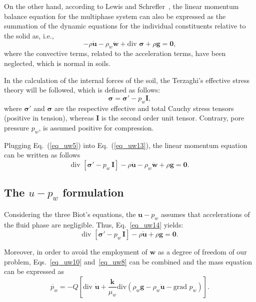 \documentclass[twocolumn]{svjour3}          %
\begin{document}
On the other hand, according to Lewis and Schrefler~\cite{LewisSchrefler98},   the linear momentum balance equation for the multiphase system  can also be expressed as the summation of the dynamic equations for the individual constituents relative to the solid as, i.e.,
\begin{equation}\label{eq_uw13}
-\rho\ddot{\boldsymbol{u}} - \rho_w\ddot{\boldsymbol{w}} + \mbox{div } \boldsymbol{\sigma}+\rho\boldsymbol{g}=\boldsymbol{0},
\end{equation}
where the convective terms, related to the acceleration terms, have been neglected, which is normal in soils. 

{\color{blue}In the calculation of the internal forces of the soil, the Terzaghi's effective stress theory  \cite{Terzaghi1925} will be followed, which is defined as follows:
\begin{equation}\label{eq_uw5}
 \boldsymbol{ \sigma} =\boldsymbol{ \sigma'} - p_{w}\textbf{I},
\end{equation}
where $ \boldsymbol{ \sigma'} $ and  $\boldsymbol{ \sigma}$ are the respective effective and total Cauchy stress tensors (positive in tension), whereas $\textbf{I}$ is the second order unit tensor.  Contrary, pore pressure $p_w$, is assumed positive for compression.
}

Plugging Eq.~(\ref{eq_uw5}) into Eq.~(\ref{eq_uw13}), the linear momentum equation can be written as follows
\begin{equation}\label{eq_uw14}
\mbox{div }\left[ \boldsymbol{ \sigma'} - p_{w} \, \textbf{I} \right]-\rho\boldsymbol{\ddot{u}}-\rho_w\boldsymbol{\ddot{w}}+\rho\boldsymbol{g}=\boldsymbol{0}.
\end{equation}
\subsection{The $u-p_w$ formulation}
\label{subsec:23}
Considering the three Biot's equations, the $\boldsymbol{u}-p_w$ assumes that accelerations of the fluid phase are negligible. Thus, Eq.~\eqref{eq_uw14} yields:
\begin{equation}\label{eq_uw15}
\mbox{div }\left[ \boldsymbol{ \sigma'} - p_{w} \, \textbf{I} \right]-\rho\boldsymbol{\ddot{u}}+\rho\boldsymbol{g}=\boldsymbol{0}.
\end{equation}

Moreover, in order to avoid the employment of $\boldsymbol{w}$ as a degree of freedom of our problem, Eqs.~\eqref{eq_uw10} and~\eqref{eq_uw8} can be combined and the mass equation can be expressed as
\begin{equation}\label{eq_uw11}
\dot{p_w} = -Q\left [ \mbox{div } \dot{\boldsymbol{u}} + \frac{\boldsymbol{k}}{\mu_w} \mbox{div}\left(   \rho_w \boldsymbol{g} - \rho_w \ddot{\boldsymbol{u}} - \mbox{grad }p_w\right)\right ].
\end{equation}
\end{document}
